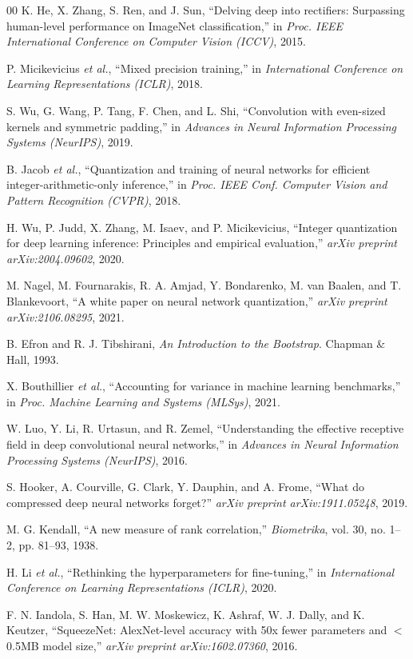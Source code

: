 \documentclass[conference]{IEEEtran}
\begin{document}
\begin{thebibliography}{00}
K. He, X. Zhang, S. Ren, and J. Sun, ``Delving deep into rectifiers: Surpassing human-level performance on ImageNet classification,'' in \textit{Proc. IEEE International Conference on Computer Vision (ICCV)}, 2015.

P. Micikevicius \textit{et al.}, ``Mixed precision training,'' in \textit{International Conference on Learning Representations (ICLR)}, 2018.

S. Wu, G. Wang, P. Tang, F. Chen, and L. Shi, ``Convolution with even-sized kernels and symmetric padding,'' in \textit{Advances in Neural Information Processing Systems (NeurIPS)}, 2019.

B. Jacob \textit{et al.}, ``Quantization and training of neural networks for efficient integer-arithmetic-only inference,'' in \textit{Proc. IEEE Conf. Computer Vision and Pattern Recognition (CVPR)}, 2018.

H. Wu, P. Judd, X. Zhang, M. Isaev, and P. Micikevicius, ``Integer quantization for deep learning inference: Principles and empirical evaluation,'' \textit{arXiv preprint arXiv:2004.09602}, 2020.

M. Nagel, M. Fournarakis, R. A. Amjad, Y. Bondarenko, M. van Baalen, and T. Blankevoort, ``A white paper on neural network quantization,'' \textit{arXiv preprint arXiv:2106.08295}, 2021.

B. Efron and R. J. Tibshirani, \textit{An Introduction to the Bootstrap}. Chapman \& Hall, 1993.

X. Bouthillier \textit{et al.}, ``Accounting for variance in machine learning benchmarks,'' in \textit{Proc. Machine Learning and Systems (MLSys)}, 2021.

W. Luo, Y. Li, R. Urtasun, and R. Zemel, ``Understanding the effective receptive field in deep convolutional neural networks,'' in \textit{Advances in Neural Information Processing Systems (NeurIPS)}, 2016.

S. Hooker, A. Courville, G. Clark, Y. Dauphin, and A. Frome, ``What do compressed deep neural networks forget?'' \textit{arXiv preprint arXiv:1911.05248}, 2019.

M. G. Kendall, ``A new measure of rank correlation,'' \textit{Biometrika}, vol. 30, no. 1--2, pp. 81--93, 1938.

H. Li \textit{et al.}, ``Rethinking the hyperparameters for fine-tuning,'' in \textit{International Conference on Learning Representations (ICLR)}, 2020.

F. N. Iandola, S. Han, M. W. Moskewicz, K. Ashraf, W. J. Dally, and K. Keutzer, ``SqueezeNet: AlexNet-level accuracy with 50x fewer parameters and $<$0.5MB model size,'' \textit{arXiv preprint arXiv:1602.07360}, 2016.

\end{thebibliography}
\end{document}
